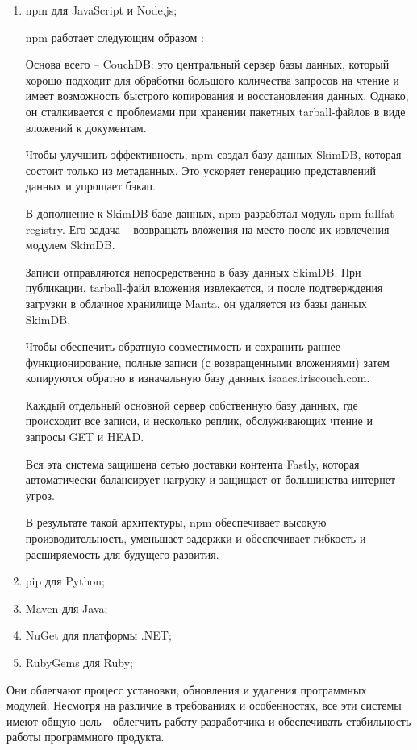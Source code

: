 \begin{enumerate}
\item npm \cite{packages:npm} для JavaScript и Node.js;

npm работает следующим образом \cite{arch:npm_moment}:

Основа всего -- CouchDB: это центральный сервер базы данных, который хорошо подходит для обработки большого количества запросов на чтение и имеет возможность быстрого копирования и восстановления данных. Однако, он сталкивается с проблемами при хранении пакетных tarball-файлов в виде вложений к документам.

Чтобы улучшить эффективность, npm создал базу данных SkimDB, которая состоит только из метаданных. Это ускоряет генерацию представлений данных и упрощает бэкап.

В дополнение к SkimDB базе данных, npm разработал модуль npm-fullfat-registry. Его задача -- возвращать вложения на место после их извлечения модулем SkimDB.

Записи отправляются непосредственно в базу данных SkimDB. При публикации, tarball-файл вложения извлекается, и после подтверждения загрузки в облачное хранилище Manta, он удаляется из базы данных SkimDB.

Чтобы обеспечить обратную совместимость и сохранить раннее функционирование, полные записи (с возвращенными вложениями) затем копируются обратно в изначальную базу данных isaacs.iriscouch.com.

Каждый отдельный основной сервер собственную базу данных, где происходит все записи, и несколько реплик, обслуживающих чтение и запросы GET и HEAD.

Вся эта система защищена сетью доставки контента Fastly, которая автоматически балансирует нагрузку и защищает от большинства интернет-угроз.

В результате такой архитектуры, npm обеспечивает высокую производительность, уменьшает задержки и обеспечивает гибкость и расширяемость для будущего развития.

\item pip \cite{packages:pip} для Python;
\item Maven \cite{packages:maven} для Java;
\item NuGet \cite{packages:nuget} для платформы .NET;
\item RubyGems \cite{packages:rubygems} для Ruby;
\end{enumerate}

Они облегчают процесс установки, обновления и удаления программных модулей. Несмотря на различие в требованиях и особенностях, все эти системы имеют общую цель - облегчить работу разработчика и обеспечивать стабильность работы программного продукта.

